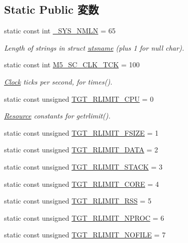 \subsection*{Static Public 変数}
\begin{DoxyCompactItemize}
\item 
static const int \hyperlink{classLinux_a1a19d4c9718c9a4ad5fa2e48271fccc9}{\_\-SYS\_\-NMLN} = 65
\begin{DoxyCompactList}\small\item\em Length of strings in struct \hyperlink{structLinux_1_1utsname}{utsname} (plus 1 for null char). \item\end{DoxyCompactList}\item 
static const int \hyperlink{classLinux_a06eb9dad0a85c4478f07f398cd87b3f1}{M5\_\-SC\_\-CLK\_\-TCK} = 100
\begin{DoxyCompactList}\small\item\em \hyperlink{classClock}{Clock} ticks per second, for times(). \item\end{DoxyCompactList}\item 
static const unsigned \hyperlink{classLinux_a2e4654637dbfb58e118058627146b080}{TGT\_\-RLIMIT\_\-CPU} = 0
\begin{DoxyCompactList}\small\item\em \hyperlink{classResource}{Resource} constants for getrlimit(). \item\end{DoxyCompactList}\item 
static const unsigned \hyperlink{classLinux_ac9f91f21e30cdd3121d5df0c433bc9b2}{TGT\_\-RLIMIT\_\-FSIZE} = 1
\item 
static const unsigned \hyperlink{classLinux_ab7cdbf4aa0a8adf81dd4b7296f3f569e}{TGT\_\-RLIMIT\_\-DATA} = 2
\item 
static const unsigned \hyperlink{classLinux_ab251873bf0e7cec0ff214e53b11045ea}{TGT\_\-RLIMIT\_\-STACK} = 3
\item 
static const unsigned \hyperlink{classLinux_ae30241d39abfaa273c33b7ea312069e8}{TGT\_\-RLIMIT\_\-CORE} = 4
\item 
static const unsigned \hyperlink{classLinux_a0821c1df130aa7cf89fefd5aea653d9e}{TGT\_\-RLIMIT\_\-RSS} = 5
\item 
static const unsigned \hyperlink{classLinux_af16b609dcc51ebef365e8258e28d777c}{TGT\_\-RLIMIT\_\-NPROC} = 6
\item 
static const unsigned \hyperlink{classLinux_a7eca1a56bf2a00dce74320c95a0b176e}{TGT\_\-RLIMIT\_\-NOFILE} = 7

\end{DoxyCompactItemize}
